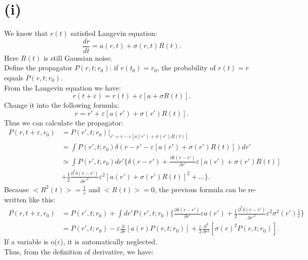 \documentclass[12pt,a4paper]{paper}
\begin{document}
\section{(i)}
We know that $r(t)$ satisfied Langevin equation:
\begin{equation}
\frac{dr}{dt}=a(r,t)+\sigma (r,t)R(t).
\end{equation}
\indent Here $R(t)$ is still Gaussian noise.\\
\indent Define the propagator $P(r,t;r_{0})$: if $r(t_0)=r_0$, the probability of $r(t)=r$ equals $P(r,t;r_{0})$.\\
\indent From the Langevin equation we have:
\begin {equation}
r(t+\varepsilon )=r(t)+\varepsilon [a+\sigma R(t)].
\end{equation}
Change it into the following formula:
\begin {equation}
r={r}'+\varepsilon [a({r}')+\sigma ({r}')R(t)].
\end{equation}
\indent Thus we can calculate the propagator:
\begin {align*}
\ P(r,t+\varepsilon ,r_{0})
& =P({r}',t;r_{0})|_{{r}'=r-\varepsilon [a({r}')+\sigma ({r}')R(t)]}\\
 &=\int P({r}',t;r_{0})\delta (r-{r}'-\varepsilon [a({r}')+\sigma ({r}')R(t)])d{r}'\\
 & \simeq \int P({r}',t;r_{0})d{r}'\{\delta (r-{r}') +\frac{\partial \delta (r-{r}')}{\partial {r}'}\varepsilon [a({r}')+\sigma ({r}')R(t)] \\
&+ \frac{1}{2}\frac{\partial^2 \delta (r-{r}')}{\partial {r}'^2} \varepsilon ^2 [a({r}')+\sigma ({r}')R(t)]^2 +... \}.\
\end{align*}
\indent Because $<R^2(t)>=\frac{1}{\varepsilon}$ and $<R(t)>=0$, the previous formula can be re-written like this:
\begin{align*}
\ P(r,t+\varepsilon ,r_{0})
& =P({r}',t;r_{0})+\int d{r}'P({r}',t;r_{0}) \{ \frac{\partial \delta (r-{r}')}{\partial {r}'}\varepsilon a({r}')+\frac{1}{2}\frac{\partial^2 \delta (r-{r}')}{\partial {r}'^2}\varepsilon ^2 \sigma ^2({r}')\frac{1}{\varepsilon } \} \\
& = P({r}',t;r_{0})-\varepsilon \frac{\partial }{\partial r}[a(r)P(r,t;r_0)]+\frac{\varepsilon }{2}\frac{\partial^2 }{\partial r^2}[\sigma (r)^2 P(r,t;r_0)].\
\end{align*}
\indent If a variable is o($\varepsilon$), it is automatically neglected.\\
\indent Thus, from the definition of derivative, we have:
\end{document}
